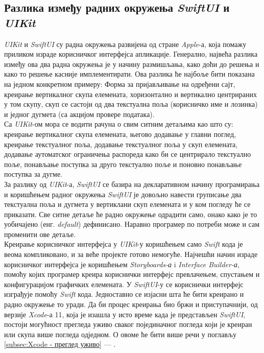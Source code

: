\documentclass[12pt,oneside]{memoir}
\begin{document}
\subsection{Разлика између радних окружења \textit{SwiftUI} и \textit{UIKit}}
\label{subsec:Разлика SwiftUI и UIKit}

\indent \textit{UIKit} и \textit{SwiftUI} су радна окружења развијена од стране \textit{Apple}-а, која помажу приликом израде корисничког интерфејса апликације. Генерално, највећа разлика између ова два радна окружења је у начину размишљања, како доћи до решења и како то решење касније имплементирати. Ова разлика ће најбоље бити показана на једном конкретном примеру: Форма за пријављивање на одређени сајт, креирање вертикалног скупа елемената, хоризонтално и вертикално центрираних у том скупу, скуп се састоји од два текстуална поља (корисничко име и лозинка) и једног дугмета (са акцијом провере података).
\\
\indent Са \textit{UIKit}-ом мора се водити рачуна о свим ситним детаљима као што су: креирање вертикалног скупа елемената, његово додавање у главни поглед, креирање текстуалног поља, додавање текстуалног поља у скуп елемената, додавање аутоматског ограничења распореда како би се центрирало текстуално поље, понављање поступка за друго текстуално поље и поновно понављање поступка за дугме. 
\\
\indent За разлику од \textit{UIKit}-а, \textit{SwiftUI} се базира на декларативном начину програмирања и коришћењем радног окружења \textit{SwiftUI} је довољно навести груписање два текстуална поља и дугмета у вертиклани скуп елемената и у ком погледу ће се приказати. Све ситне детаље ће радно окружење одрадити само, онако како је то уобичајено (енг. \textit{default}) дефинисано. Наравно програмер по потреби може и сам променити ове детаље.
\\
\indent Креирање корисничког интерфејса у \textit{UIKit}-у коришћењем само \textit{Swift} кода је веома компликовано, и за веће пројекте готово немогуће. Најчешћи начин израде корисничког интерфејса је коришћењем \textit{Storyboards-а} i \textit{Interface Builder-а}, помоћу којих програмер креира кориснички интерфејс превлачењем, спустањем и конфигурацијом графичких елемената. У \textit{SwiftUI}-у се кориснички интерфејс изграђује помоћу \textit{Swift} кода. Једноставно се изјасни шта ће бити креирано и радно окружење то уради. Да би процес креирања био бржи и приступачнији, од верзије \textit{Xcode}-а 11, која је изашла у исто време када је представљен \textit{SwiftUI}, постоји могућност прегледа уживо сваког појединачног погледа који је креиран или скупа више погледа одједном. О овоме ће бити више речи у поглављу \ref{subsec:Xcode - преглед уживо} --- .
\end{document}
